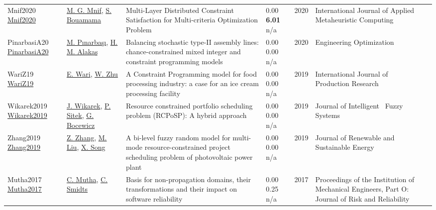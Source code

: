 {\begin{longtable}{p{3cm}p{5cm}p{10cm}p{1cm}rp{2.5cm}l}
Mnif2020 \href{http://dx.doi.org/10.4018/ijamc.2020040107}{Mnif2020} & \hyperref[auth:a1961]{M. G. Mnif}, \hyperref[auth:a1962]{S. Bouamama} & Multi-Layer Distributed Constraint Satisfaction for Multi-criteria Optimization Problem & \noindent{}\textcolor{black!50}{0.00} \textbf{6.01} n/a & 2020 & International Journal of Applied Metaheuristic Computing & \cite{Mnif2020}\\
PinarbasiA20 \href{http://dx.doi.org/10.1080/0305215x.2020.1716746}{PinarbasiA20} & \hyperref[auth:a1383]{M. Pınarbaşı}, \hyperref[auth:a763]{H. M. Alakaş} & Balancing stochastic type-II assembly lines: chance-constrained mixed integer and constraint programming models & \noindent{}\textcolor{black!50}{0.00} \textcolor{black!50}{0.00} n/a & 2020 & \cellcolor{red!20}Engineering Optimization & \cite{PinarbasiA20}\\
WariZ19 \href{http://dx.doi.org/10.1080/00207543.2019.1571250}{WariZ19} & \hyperref[auth:a838]{E. Wari}, \hyperref[auth:a839]{W. Zhu} & A Constraint Programming model for food processing industry: a case for an ice cream processing facility & \noindent{}\textcolor{black!50}{0.00} \textcolor{black!50}{0.00} n/a & 2019 & \cellcolor{red!20}International Journal of Production Research & \cite{WariZ19}\\
Wikarek2019 \href{http://dx.doi.org/10.3233/jifs-179364}{Wikarek2019} & \hyperref[auth:a534]{J. Wikarek}, \hyperref[auth:a1474]{P. Sitek}, \hyperref[auth:a629]{G. Bocewicz} & Resource constrained portfolio scheduling problem (RCPoSP): A hybrid approach & \noindent{}\textcolor{black!50}{0.00} \textcolor{black!50}{0.00} n/a & 2019 & Journal of Intelligent \  Fuzzy Systems & \cite{Wikarek2019}\\
Zhang2019 \href{http://dx.doi.org/10.1063/1.5053623}{Zhang2019} & \hyperref[auth:a1742]{Z. Zhang}, \hyperref[auth:a1743]{M. Liu}, \hyperref[auth:a1744]{X. Song} & A bi-level fuzzy random model for multi-mode resource-constrained project scheduling problem of photovoltaic power plant & \noindent{}\textcolor{black!50}{0.00} \textcolor{black!50}{0.00} n/a & 2019 & Journal of Renewable and Sustainable Energy & \cite{Zhang2019}\\
Mutha2017 \href{http://dx.doi.org/10.1177/1748006x17744380}{Mutha2017} & \hyperref[auth:a1954]{C. Mutha}, \hyperref[auth:a1955]{C. Smidts} & Basis for non-propagation domains, their transformations and their impact on software reliability & \noindent{}\textcolor{black!50}{0.00} 0.25 n/a & 2017 & Proceedings of the Institution of Mechanical Engineers, Part O: Journal of Risk and Reliability & \cite{Mutha2017}\\

\end{longtable}}
